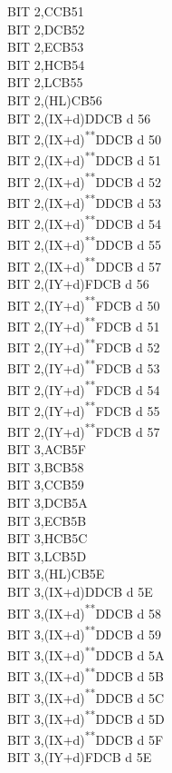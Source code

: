 \documentclass[12pt,twoside,openright,a4paper]{book}
\newcommand{\UNDOC}{\textnormal{\textsuperscript{**}}}
\begin{document}
\begin{multicols}{3}
{\begin{tabbing}
		BIT 2,C\>CB51\\
		BIT 2,D\>CB52\\
		BIT 2,E\>CB53\\
		BIT 2,H\>CB54\\
		BIT 2,L\>CB55\\
		BIT 2,(HL)\>CB56\\
		BIT 2,(IX+d)\>DDCB d 56\\
		BIT 2,(IX+d)\UNDOC\>DDCB d 50\\
		BIT 2,(IX+d)\UNDOC\>DDCB d 51\\
		BIT 2,(IX+d)\UNDOC\>DDCB d 52\\
		BIT 2,(IX+d)\UNDOC\>DDCB d 53\\
		BIT 2,(IX+d)\UNDOC\>DDCB d 54\\
		BIT 2,(IX+d)\UNDOC\>DDCB d 55\\
		BIT 2,(IX+d)\UNDOC\>DDCB d 57\\
		BIT 2,(IY+d)\>FDCB d 56\\
		BIT 2,(IY+d)\UNDOC\>FDCB d 50\\
		BIT 2,(IY+d)\UNDOC\>FDCB d 51\\
		BIT 2,(IY+d)\UNDOC\>FDCB d 52\\
		BIT 2,(IY+d)\UNDOC\>FDCB d 53\\
		BIT 2,(IY+d)\UNDOC\>FDCB d 54\\
		BIT 2,(IY+d)\UNDOC\>FDCB d 55\\
		BIT 2,(IY+d)\UNDOC\>FDCB d 57\\
		BIT 3,A\>CB5F\\
		BIT 3,B\>CB58\\
		BIT 3,C\>CB59\\
		BIT 3,D\>CB5A\\
		BIT 3,E\>CB5B\\
		BIT 3,H\>CB5C\\
		BIT 3,L\>CB5D\\
		BIT 3,(HL)\>CB5E\\
		BIT 3,(IX+d)\>DDCB d 5E\\
		BIT 3,(IX+d)\UNDOC\>DDCB d 58\\
		BIT 3,(IX+d)\UNDOC\>DDCB d 59\\
		BIT 3,(IX+d)\UNDOC\>DDCB d 5A\\
		BIT 3,(IX+d)\UNDOC\>DDCB d 5B\\
		BIT 3,(IX+d)\UNDOC\>DDCB d 5C\\
		BIT 3,(IX+d)\UNDOC\>DDCB d 5D\\
		BIT 3,(IX+d)\UNDOC\>DDCB d 5F\\
		BIT 3,(IY+d)\>FDCB d 5E\\

\end{tabbing}}
\end{multicols}
\end{document}
